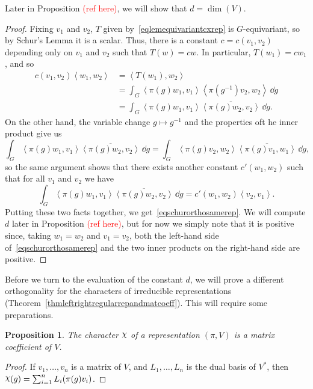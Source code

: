\documentclass[12pt,reqno]{book}%
\newtheorem{proposition}{Proposition}[chapter]
\theoremstyle{definition}
\theoremstyle{remark}
\theoremstyle{theorem}
\theoremstyle{remark}
\newcommand{\mychi}{\raisebox{2pt}{$\chi$}}
\renewcommand{\d}{\dd}
\begin{document}
Later in Proposition \textcolor{red}{(ref here)}, we will show that $d = \dim(V)$.

\begin{proof}%
    Fixing $v_1$ and $v_2$, $T$ given by~\eqref{eqlemequivariantcxrep} is $G$-equivariant, so by Schur's Lemma it is a scalar.
    Thus, there is a constant $c = c(v_1, v_2)$ depending only on $v_1$ and $v_2$ such that $T(w) = cw$.
    In particular, $T(w_1) = cw_1$, and so
    \begin{align*}
        c(v_1, v_2) {\left\langle w_1, w_2\right\rangle} &= {\left\langle T(w_1), w_2\right\rangle} \\
        &= \int_{G} {\left\langle \pi(g)w_1, v_1\right\rangle} {\left\langle \pi(g^{-1})v_2, w_2\right\rangle} \, \d g \\
        &= \int_{G} {\left\langle \pi(g)w_1, v_1\right\rangle} \overline{{\left\langle \pi(g)w_2, v_2\right\rangle}} \, \d g.
    \end{align*}
    On the other hand, the variable change $g \mapsto g^{-1}$ and the properties oft he inner product give us
    \[
        \int_{G} {\left\langle \pi(g)w_1, v_1\right\rangle} \overline{{\left\langle \pi(g)w_2, v_2\right\rangle}} \, \d g = \int_{G} {\left\langle \pi(g)v_2, w_2\right\rangle}\overline{{\left\langle \pi(g)v_1, w_1\right\rangle}} \, \d g,
    \]
    so the same argument shows that there exists another constant $c'(w_1, w_2)$ such that for all $v_1$ and $v_2$ we have
    \[
        \int_{G} {\left\langle \pi(g)w_1, v_1\right\rangle} \overline{{\left\langle \pi(g)w_2, v_2\right\rangle}} \, \d g = c'(w_1, w_2) {\left\langle v_2, v_1\right\rangle}.
    \]
    Putting these two facts together, we get~\eqref{eqschurorthosamerep}.
    We will compute $d$ later in Proposition \textcolor{red}{(ref here)}, but for now we simply note that it is positive since, taking $w_1 = w_2$ and $v_1 = v_2$, both the left-hand side of~\eqref{eqschurorthosamerep} and the two inner products on the right-hand side are positive.
\end{proof}%

Before we turn to the evaluation of the constant $d$, we will prove a different orthogonality for the characters of irreducible representations (Theorem~\ref{thmleftrightregularrepandmatcoeff}).
This will require some preparations.

\begin{proposition}\label{propcharismatcoeff}%
    The character $\mychi$ of a representation $(\pi, V)$ is a matrix coefficient of $V$.
\end{proposition}%
\begin{proof}%
    If $v_1, \ldots, v_n$ is a matrix of $V$, and $L_1, \ldots, L_n$ is the dual basis of $V^*$, then $\mychi(g) = \sum_{i=1}^{n} L_i(\pi(g)v_i)$.
\end{proof}%
\end{document}
